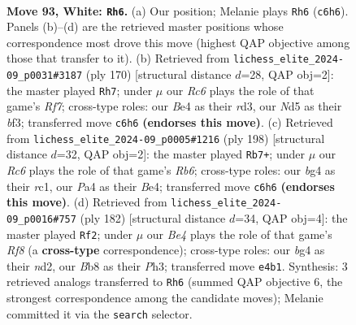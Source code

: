 \documentclass[11pt]{article}
\begin{document}
\clearpage

\begin{figure}[p]\centering
\begin{subfigure}{0.46\textwidth}\centering
\resizebox{\linewidth}{!}{%
\newchessgame
\chessboard[
  setfen={1B6/5k2/1PR5/3N4/P3B1b1/1K5p/8/6r1 w - - 7 93},
  showmover=false,
  pgfstyle=straightmove, color=movearrow, markmove={c6-h6}
]}
\caption{}
\end{subfigure}\hfill
\begin{subfigure}{0.46\textwidth}\centering
\resizebox{\linewidth}{!}{%
\newchessgame
\chessboard[
  setfen={4k3/5R2/8/4B2p/1KP5/3r1bP1/8/8 w - - 61 86},
  showmover=false,
  pgfstyle=straightmove, color=movearrow, markmove={f7-h7}
]}
\caption{}
\end{subfigure}
\\[4pt]
\begin{subfigure}{0.46\textwidth}\centering
\resizebox{\linewidth}{!}{%
\newchessgame
\chessboard[
  setfen={8/4k3/1R4P1/4K2p/4B2P/8/8/2r5 w - - 3 100},
  showmover=false,
  pgfstyle=straightmove, color=movearrow, markmove={b6-b7}
]}
\caption{}
\end{subfigure}\hfill
\begin{subfigure}{0.46\textwidth}\centering
\resizebox{\linewidth}{!}{%
\newchessgame
\chessboard[
  setfen={3N1R2/8/6k1/6p1/8/7P/r2n2PK/8 w - - 82 92},
  showmover=false,
  pgfstyle=straightmove, color=movearrow, markmove={f8-f2}
]}
\caption{}
\end{subfigure}
\caption{\textbf{Move 93, White: \texttt{Rh6}.} (a) Our position; Melanie plays \texttt{Rh6} (\texttt{c6h6}). Panels (b)--(d) are the retrieved master positions whose correspondence most drove this move (highest QAP objective among those that transfer to it). (b) Retrieved from \texttt{lichess\_elite\_2024-09\_p0031\#3187} (ply 170) [structural distance $d$=28, QAP obj=2]: the master played \texttt{Rh7}; under $\mu$ our \emph{Rc6} plays the role of that game's \emph{Rf7}; cross-type roles: our \emph{B}e4 as their \emph{r}d3, our \emph{N}d5 as their \emph{b}f3; transferred move \texttt{c6h6} \textbf{(endorses this move)}. (c) Retrieved from \texttt{lichess\_elite\_2024-09\_p0005\#1216} (ply 198) [structural distance $d$=32, QAP obj=2]: the master played \texttt{Rb7+}; under $\mu$ our \emph{Rc6} plays the role of that game's \emph{Rb6}; cross-type roles: our \emph{b}g4 as their \emph{r}c1, our \emph{P}a4 as their \emph{B}e4; transferred move \texttt{c6h6} \textbf{(endorses this move)}. (d) Retrieved from \texttt{lichess\_elite\_2024-09\_p0016\#757} (ply 182) [structural distance $d$=34, QAP obj=4]: the master played \texttt{Rf2}; under $\mu$ our \emph{Be4} plays the role of that game's \emph{Rf8} (a \textbf{cross-type} correspondence); cross-type roles: our \emph{b}g4 as their \emph{n}d2, our \emph{B}b8 as their \emph{P}h3; transferred move \texttt{e4b1}. Synthesis: 3 retrieved analogs transferred to \texttt{Rh6} (summed QAP objective 6, the strongest correspondence among the candidate moves); Melanie committed it via the \texttt{search} selector.}
\label{fig:thought-m184}
\end{figure}
\end{document}
